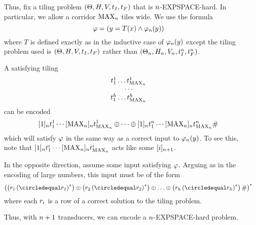 Thus, fix a tiling problem
$\tup{\tiles, \hrel, \vrel, \inittile, \fintile}$
that is $\expheight$-EXPSPACE-hard.
In particular, we allow a corridor $\nmax{\expheight}$ tiles wide.
We use the formula
\[
    \probfmla = \brac{y = \ap{T}{x} \land \goodnums{\expheight}{y}}
\]
where $T$ is defined exactly as in the inductive case of
$\goodnums{\expheight}{y}$
except the tiling problem used is
$\tup{\tiles, \hrel, \vrel, \inittile, \fintile}$
rather than
$\tup{\tilesnum{\expheight},
      \hrelnum{\expheight},
      \vrelnum{\expheight},
      \inittilenum{\expheight},
      \fintilenum{\expheight}}$.

A satisfying tiling
\[
    \begin{array}{c}
        \tile^1_1 \ldots \tile^1_{\nmax{\expheight}} \\
        \cdots \\
        \tile^\tileheight_1 \ldots \tile^\tileheight_{\nmax{\expheight}}
    \end{array}
\]
can be encoded
\[
    \tenc{\expheight}{1} \tile^1_1
    \cdots
    \tenc{\expheight}{\nmax{\expheight}} \tile^1_{\nmax{\expheight}}
    \numplus
    \cdots
    \numplus
    \tenc{\expheight}{1} \tile^\expheight_1
    \cdots
    \tenc{\expheight}{\nmax{\expheight}} \tile^\expheight_{\nmax{\expheight}}
    \numsep
\]
which will satisfy $\probfmla$ in the same way as a correct input to
$\goodnums{\expheight}{y}$.
To see this, note that
$\tenc{\expheight}{1} \tile^i_1
 \cdots
 \tenc{\expheight}{\nmax{\expheight}} \tile^i_{\nmax{\expheight}}$
acts like some
$\tenc{\expheight+1}{i}$.

In the opposite direction, assume some input satisfying $\probfmla$.
Arguing as in the encoding of large numbers, this input must be of the form
\[
    \brac{
        \brac{\tilerow_1 \brac{\numeq \tilerow_1}^\ast}
        \numplus
        \brac{\tilerow_2 \brac{\numeq \tilerow_2}^\ast}
        \numplus
        \ldots
        \numplus
        \brac{
            \tilerow_\tileheight
            \brac{\numeq \tilerow_\tileheight}^\ast
        }
        \numsep
    }^\ast
\]
where each $\tilerow_i$ is a row of a correct solution to the tiling problem.

Thus, with $\expheight+1$ transducers, we can encode a $\expheight$-EXPSPACE-hard problem.
